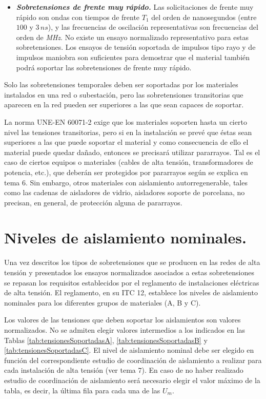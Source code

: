 \begin{itemize}
                \item \textbf{\textit{Sobretensiones de frente muy rápido.}} Las solicitaciones de frente muy rápido son ondas con tiempos de frente $T_1$ del orden de nanosegundos (entre $100$ y $3\,\textit{ns}$), y las frecuencias de oscilación representativas son frecuencias del orden de \textit{MHz}. No existe un ensayo normalizado representativo para estas sobretensiones. Los ensayos de tensión soportada de impulsos tipo rayo y de impulsos maniobra son suficientes para demostrar que el material también podrá soportar las sobretensiones de frente muy rápido.
            \end{itemize}

            Solo las sobretensiones temporales deben ser soportadas por los materiales instalados en una red o subestación, pero las sobretensiones transitorias que aparecen en la red pueden ser superiores a las que sean capaces de soportar.\newline
            
            La norma UNE-EN 60071-2 exige que los materiales soporten hasta un cierto nivel las tensiones transitorias, pero si en la instalación se prevé que éstas sean superiores a las que puede soportar el material y como consecuencia de ello el material puede quedar dañado, entonces se precisará utilizar pararrayos. Tal es el caso de ciertos equipos o materiales (cables de alta tensión, transformadores de potencia, etc.), que deberán ser protegidos por pararrayos según se explica en tema 6. Sin embargo, otros materiales con aislamiento autorregenerable, tales como las cadenas de aisladores de vidrio, aisladores soporte de porcelana, no precisan, en general, de protección alguna de pararrayos.

    \section{Niveles de aislamiento nominales.}
        Una vez descritos los tipos de sobretensiones que se producen en las redes de alta tensión y presentados los ensayos normalizados asociados a estas sobretensiones se repasan los requisitos establecidos por el reglamento de instalaciones eléctricas de alta tensión. El reglamento, en su ITC 12, establece los niveles de aislamiento nominales para los diferentes grupos de materiales (A, B y C).\newline

        Los valores de las tensiones que deben soportar los aislamientos son valores normalizados. No se admiten elegir valores intermedios a los indicados en las Tablas \ref{tab:tensionesSoportadasA}, \ref{tab:tensionesSoportadasB} y \ref{tab:tensionesSoportadasC}. El nivel de aislamiento nominal debe ser elegido en función del correspondiente estudio de coordinación de aislamiento a realizar para cada instalación de alta tensión (ver tema 7). En caso de no haber realizado estudio de coordinación de aislamiento será necesario elegir el valor máximo de la tabla, es decir, la última fila para cada una de las $U_\textit{m}$.  

